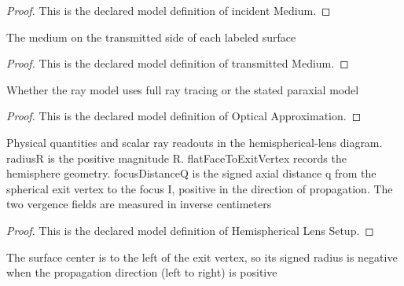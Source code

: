 \begin{proof}
  This is the declared model definition of incident Medium.
\end{proof}
\begin{definition}
  \label{def:physics:phyx-mini-0033:phyxminiproblems-problemphyxmini0033-transmittedmedium}
  The medium on the transmitted side of each labeled surface
\end{definition}
\begin{proof}
  This is the declared model definition of transmitted Medium.
\end{proof}
\begin{definition}
  \label{def:physics:phyx-mini-0033:phyxminiproblems-problemphyxmini0033-opticalapproximation}
  Whether the ray model uses full ray tracing or the stated paraxial model
\end{definition}
\begin{proof}
  This is the declared model definition of Optical Approximation.
\end{proof}
\begin{definition}
  \label{def:physics:phyx-mini-0033:phyxminiproblems-problemphyxmini0033-hemisphericallenssetup}
  Physical quantities and scalar ray readouts in the hemispherical-lens diagram. radiusR is the positive magnitude R. flatFaceToExitVertex records the hemisphere geometry. focusDistanceQ is the signed axial distance q from the spherical exit vertex to the focus I, positive in the direction of propagation. The two vergence fields are measured in inverse centimeters
\end{definition}
\begin{proof}
  This is the declared model definition of Hemispherical Lens Setup.
\end{proof}
\begin{definition}
  \label{def:physics:phyx-mini-0033:phyxminiproblems-problemphyxmini0033-signedexitradiusincentimeters}
  The surface center is to the left of the exit vertex, so its signed radius is negative when the propagation direction (left to right) is positive
\end{definition}
